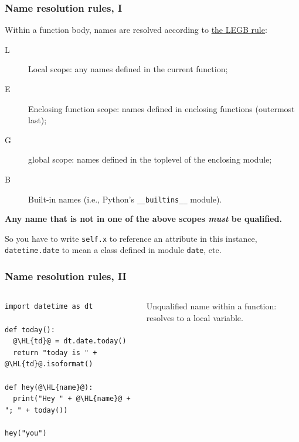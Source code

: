 \documentclass[english,serif,mathserif,xcolor=pdftex,dvipsnames,table]{beamer}
\begin{document}
\begin{frame}[fragile]
  \frametitle{Name resolution rules, I}
  \small

  Within a function body, names are resolved according to \href{http://stackoverflow.com/questions/291978/short-description-of-python-scoping-rules/292502#292502}{the LEGB rule}:
  \begin{description}
  \item[L] Local scope: any names defined in the current function;
  \item[E] Enclosing function scope: names defined in enclosing
    functions (outermost last);
  \item[G] global scope: names defined in the toplevel of the enclosing module;
  \item[B] Built-in names (i.e., Python's \texttt{\_\_builtins\_\_} module).
  \end{description}

  \+
  \textbf{Any name that is not in one of the above scopes \emph{must}
    be qualified.}

  \+
  So you have to write \texttt{self.x} to reference an attribute in
  this instance, \texttt{datetime.date} to mean a class defined in module
  \texttt{date}, etc.

\end{frame}


\begin{frame}[fragile]
  \frametitle{Name resolution rules, II}
  \begin{columns}
    \begin{column}[t]{0.6\linewidth}
\begin{lstlisting}
import datetime as dt

def today():
  @\HL{td}@ = dt.date.today()
  return "today is " + @\HL{td}@.isoformat()

def hey(@\HL{name}@):
  print("Hey " + @\HL{name}@ + "; " + today())

hey("you")
\end{lstlisting}
    \end{column}
    \begin{column}[t]{0.4\linewidth}
      \raggedleft
      Unqualified name within a function: resolves to a local variable.
    \end{column}
  \end{columns}
\end{frame}
\end{document}
